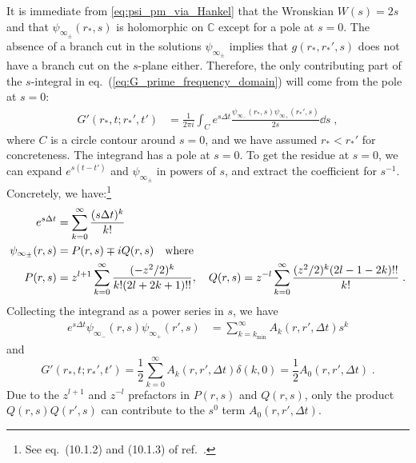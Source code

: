 \documentclass[reprint,aps,physrev,superscriptaddress,10pt,notitlepage,prd,nofootinbib,onecolumn]{revtex4-2}
\begin{document}
It is immediate from \eqref{eq:psi_pm_via_Hankel}  that the Wronskian $W(s)=2s$ and that $\psi_{\infty_\pm}(r_*, s)$ is holomorphic on $\mathbb{C}$ except for a pole at $s=0$.
The absence of a branch cut in the solutions \(\psi_{\infty_\pm}\) implies that 
\(g(r_*,r_*',s)\) does not have a branch cut on the $s$-plane either.
Therefore, the only contributing part of the $s$-integral in eq.~(\ref{eq:G_prime_frequency_domain}) will come from the pole at $s=0$:
\begin{align}
  \label{eq:G_prime_contour_integral}
  G'(r_*, t; r_*', t')  &= \frac{1}{2 \pi i} \int_{C} e^{s \Delta{t}} \frac{\psi_{\infty_-}(r_*, s) \psi_{\infty_+}(r_*', s)}{2s} \dd{s} \;,
\end{align}
where $C$ is a circle contour around $s=0$, and we have assumed $r_* < r_*'$ for concreteness. The integrand has a pole at $s=0$. 
To get the residue at $s=0$, we can expand $e^{s(t-t')}$ and $\psi_{\infty_\pm}$ in powers of $s$, and extract the coefficient for $s^{-1}$.
Concretely, we have:\footnote{See eq.~(10.1.2) and (10.1.3) of ref.~\cite{abramowitz+stegun}.}
\begin{align}
    e^{s \Delta{t}} &= \sum_{k=0}^\infty \frac{(s \Delta{t})^k}{k!} \nonumber \\
  \psi_{\infty_\pm}(r, s) &= P(r, s) \mp i Q(r, s) \qq{where} \nonumber \\
   P(r, s) &= z^{l+1} \sum_{k=0}^\infty \frac{(-z^2/2)^k }{k! (2l+2k+1)!!},\quad Q(r, s) = z^{-l} \sum_{k=0}^{\infty} \frac{(z^2/2)^k  (2l-1-2k)!! }{k!} \;.
\end{align}
Collecting the integrand as a power series in $s$, we have
\begin{align}
  e^{s\Delta{t}} \psi_{\infty_-}(r, s) \psi_{\infty_+}(r', s) &= \sum_{k=k_{\mathrm{min}}}^\infty A_k(r, r', \Delta{t}) s^k
\end{align}
and
\begin{equation}
     G'(r_*, t; r_*', t') = \frac{1}{2}\sum_{k=0}^{\infty} A_k(r, r', \Delta{t}) \delta(k, 0)=\frac{1}{2}A_0(r, r', \Delta{t}) \;.
\end{equation}
Due to the $z^{l+1}$ and $z^{-l}$ prefactors in \( P(r, s) \) and \( Q(r, s) \), only the product \( Q(r, s) Q(r', s) \) can contribute to the $s^0$ term \( A_0(r, r', \Delta{t}) \).
\end{document}
